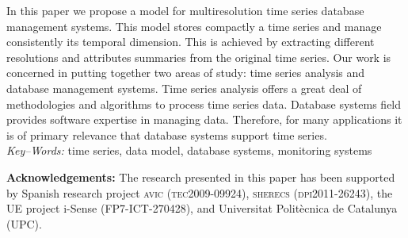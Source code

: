 \documentclass[twocolumn,11pt,a4paper]{article}
\begin{document}
{\begin{minipage}[b]{6.9in}
In this paper we propose a model for multiresolution time series
database management systems. This model stores compactly a time series
and manage consistently its temporal dimension. This is achieved by
extracting different resolutions and attributes summaries from the
original time series.
%
Our work is concerned in putting together two areas of study: time
series analysis and database management systems. Time series analysis
offers a great deal of methodologies and algorithms to process time
series data. Database systems field provides software expertise in
managing data. Therefore, for many applications it is of primary
relevance that database systems support time series.
%
\\ [4mm] {\it Key--Words:}
time series, data model, database systems, monitoring systems
\end{minipage}
\vspace{-10pt}}

\maketitle

\thispagestyle{empty} \pagestyle{empty}
%
%









\vspace{5pt plus 5pt} 
\noindent \textbf{Acknowledgements:} The research
presented in this paper has been supported by Spanish research project
\textsc{avic (tec2009-09924)}, \textsc{sherecs (dpi2011-26243)}, the
UE project i-Sense ({\small FP7-ICT-270428}), and Universitat
Polit\`{e}cnica de Catalunya (UPC).

\printbibliography{}
\end{document}
